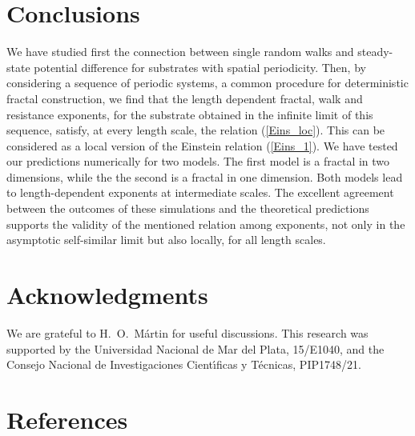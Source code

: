 \documentclass[12pt]{iopart}
\begin{document}
\section{Conclusions}\label{sec:conclu}
We have studied first the connection between  single random walks and
steady-state  potential difference for substrates with spatial periodicity.
Then, by considering a sequence of periodic systems, a common procedure  
for deterministic fractal construction, we find  that the length 
dependent fractal,
walk and resistance exponents, for the substrate obtained in the infinite
limit of this sequence, satisfy, at every length scale, the relation
(\ref{Eins_loc}). This  can be considered as a local version of the 
 Einstein relation (\ref{Eins_1}).
 We have tested our predictions numerically for two models. The first
 model is a fractal 
 in two dimensions, while the the second is a fractal in one dimension.
 Both models lead to 
 length-dependent exponents at intermediate scales. The excellent agreement between 
 the outcomes of these simulations and the theoretical predictions
 supports the validity of the mentioned relation among  exponents,
 not only in the asymptotic self-similar limit but also locally, for
 all length scales.



\section*{Acknowledgments}
We are grateful to H.~O.~M\'artin for useful discussions.
This research was supported by the Universidad Nacional de Mar del Plata,
15/E1040, and the Consejo Nacional de Investigaciones
Cient\'{\i}ficas y  T\'ecnicas, PIP1748/21.
\section*{References}

%
%

\end{document}
